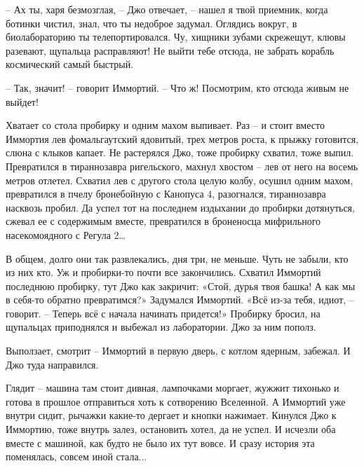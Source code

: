 \documentclass[ebook,oneside,final,openright]{memoir}
\begin{document}
– Ах ты, харя безмозглая, – Джо отвечает, – нашел я твой приемник, когда ботинки чистил, знал, что ты недоброе задумал. Оглядись вокруг, в биолабораторию ты телепортировался. Чу, хищники зубами скрежещут, клювы разевают, щупальца расправляют! Не выйти тебе отсюда, не забрать корабль космический самый быстрый.\par
– Так, значит! – говорит Иммортий. – Что ж! Посмотрим, кто отсюда живым не выйдет!\par
\par
Хватает со стола пробирку и одним махом выпивает. Раз – и стоит вместо Иммортия лев фомальгаутский ядовитый, трех метров роста, к прыжку готовится, слюна с клыков капает. Не растерялся Джо, тоже пробирку схватил, тоже выпил. Превратился в тираннозавра ригельского, махнул хвостом – лев от него на восемь метров отлетел. Схватил лев с другого стола целую колбу, осушил одним махом, превратился в пчелу бронебойную с Канопуса 4, разогнался, тираннозавра насквозь пробил. Да успел тот на последнем издыхании до пробирки дотянуться, сжевал ее с содержимым вместе, превратился в броненосца мифрильного насекомоядного с Регула 2…\par
\par
В общем, долго они так развлекались, дня три, не меньше. Чуть не забыли, кто из них кто. Уж и пробирки-то почти все закончились. Схватил Иммортий последнюю пробирку, тут Джо как закричит: «Стой, дурья твоя башка! А как мы в себя-то обратно превратимся?» Задумался Иммортий. «Всё из-за тебя, идиот, – говорит. – Теперь всё с начала начинать придется!» Пробирку бросил, на щупальцах приподнялся и выбежал из лаборатории. Джо за ним пополз.\par
\par
Выползает, смотрит – Иммортий в первую дверь, с котлом ядерным, забежал. И Джо туда направился.\par
\par
Глядит – машина там стоит дивная, лампочками моргает, жужжит тихонько и готова в прошлое отправиться хоть к сотворению Вселенной. А Иммортий уже внутри сидит, рычажки какие-то дергает и кнопки нажимает. Кинулся Джо к Иммортию, тоже внутрь залез, остановить хотел, да не успел. И исчезли оба вместе с машиной, как будто не было их тут вовсе. И сразу история эта поменялась, совсем иной стала...\par
\end{document}
